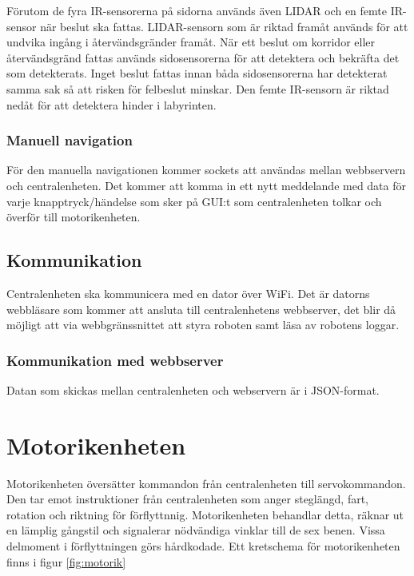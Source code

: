 \documentclass[a4paper,titlepage,12pt]{article}
\begin{document}

    Förutom de fyra IR-sensorerna på sidorna används även LIDAR och en femte
    IR-sensor när beslut ska fattas. LIDAR-sensorn som är riktad framåt används
    för att undvika ingång i återvändsgränder framåt. När ett beslut om korridor
    eller återvändsgränd fattas används sidosensorerna för att detektera och
    bekräfta det som detekterats. Inget beslut fattas innan båda sidosensorerna
    har detekterat samma sak så att risken för felbeslut minskar. Den femte
    IR-sensorn är riktad nedåt för att detektera hinder i labyrinten. 
    
    
    \subsubsection{Manuell navigation}
    För den manuella navigationen kommer sockets att användas mellan webbservern
    och centralenheten. Det kommer att komma in ett nytt meddelande med data för varje
    knapptryck/händelse som sker på GUI:t som centralenheten tolkar och överför
    till motorikenheten. 

	\subsection{Kommunikation}
	Centralenheten ska kommunicera med en dator över WiFi. Det är datorns webbläsare 
	som kommer att ansluta till centralenhetens webbserver, det blir då möjligt att
	via webbgränssnittet att styra roboten samt läsa av robotens loggar. 	
	\subsubsection{Kommunikation med webbserver}
	Datan som skickas mellan centralenheten och webservern är i JSON-format.

    \newpage
	\section{Motorikenheten}
	Motorikenheten översätter kommandon från centralenheten till servokommandon. Den tar emot 
	instruktioner från centralenheten som anger steglängd, fart, rotation och riktning för 
	förflyttnnig. Motorikenheten behandlar detta, räknar ut en lämplig gångstil och 
	signalerar nödvändiga vinklar till de sex benen. Vissa delmoment i förflyttningen 
	görs hårdkodade. Ett kretschema för motorikenheten finns i figur \ref{fig:motorik}
\end{document}
